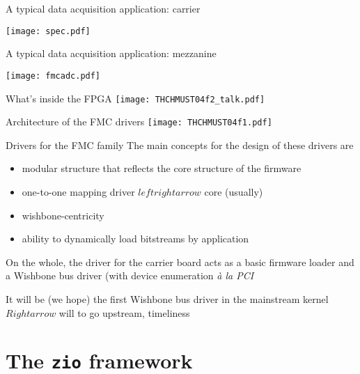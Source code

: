 \documentclass[compress,red]{beamer}
\begin{document}
\begin{frame}{A typical data acquisition application: carrier}
\begin{center}
\texttt{[image: spec.pdf]}
\end{center}
\end{frame}

\begin{frame}{A typical data acquisition application: mezzanine}
\begin{center}
\texttt{[image: fmcadc.pdf]}
\end{center}
\end{frame}

\begin{frame}{What's inside the FPGA}
\texttt{[image: THCHMUST04f2\_talk.pdf]}
\end{frame}

\begin{frame}{Architecture of the FMC drivers}
\texttt{[image: THCHMUST04f1.pdf]}
\end{frame}

\begin{frame}{Drivers for the FMC family}
The main concepts for the design of these drivers are
\begin{itemize}
\pause
\item modular structure that reflects the core structure of the firmware
\pause
\item one-to-one mapping driver $leftrightarrow$ core (usually)
\pause
\item wishbone-centricity
\pause
\item ability to dynamically load bitstreams by application
\end{itemize}
\pause
On the whole, the driver for the carrier board acts as a basic firmware
loader and a Wishbone bus driver (with device enumeration
\emph{\`a la PCI}

\pause
It will be (we hope) the first Wishbone bus driver in the mainstream
kernel $Rightarrow$ will to go upstream, timeliness
\end{frame}

\section{The \texttt{zio} framework}
\end{document}
